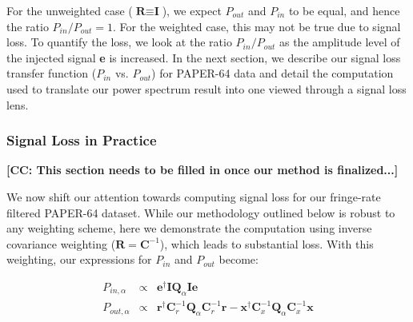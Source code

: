 \documentclass[preprint2,numberedappendix,tighten]{aastex6}  %
\newcommand{\cc}[1]{{\color{purple} \textbf{[CC: #1]}}}
\begin{document}
For the unweighted case ($\textbf{R} \equiv \textbf{I}$), we expect $P_{out}$ and $P_{in}$ to be equal, and hence the ratio $P_{in} / P_{out} = 1$. For the weighted case, this may not be true due to signal loss. To quantify the loss, we look at the ratio $P_{in}/P_{out}$ as the amplitude level of the injected signal \textbf{e} is increased. In the next section, we describe our signal loss transfer function ($P_{in}$ vs. $P_{out}$) for PAPER-64 data and detail the computation used to translate our power spectrum result into one viewed through a signal loss lens.

\subsubsection{Signal Loss in Practice}

\cc{This section needs to be filled in once our method is finalized...}

We now shift our attention towards computing signal loss for our fringe-rate filtered PAPER-64 dataset. While our methodology outlined below is robust to any weighting scheme, here we demonstrate the computation using inverse covariance weighting ($\textbf{R} = \textbf{C}^{-1}$), which leads to substantial loss. With this weighting, our expressions for $P_{in}$ and $P_{out}$ become:

\begin{eqnarray}
P_{in,\alpha} &\propto& \textbf{e}^{\dagger}\textbf{I}\textbf{Q}_{\alpha}\textbf{I}\textbf{e} \\
P_{out,\alpha} &\propto& \textbf{r}^{\dagger}\textbf{C}_{r}^{-1}\textbf{Q}_{\alpha}\textbf{C}_{r}^{-1}\textbf{r} - \textbf{x}^{\dagger}\textbf{C}_{x}^{-1}\textbf{Q}_{\alpha}\textbf{C}_{x}^{-1}\textbf{x} 
\end{eqnarray}


\end{document}
